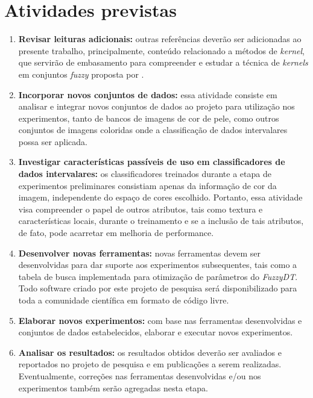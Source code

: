\section{Atividades previstas}
\label{sec:atividades_previstas}
\begin{enumerate}
    \item \textbf{Revisar leituras adicionais:} outras referências deverão ser adicionadas ao presente trabalho, principalmente, conteúdo relacionado a métodos de \emph{kernel}, que servirão de embasamento para compreender e estudar a técnica de \emph{kernels} em conjuntos \emph{fuzzy} proposta por \citet{guevara:14}.

    \item \textbf{Incorporar novos conjuntos de dados:} essa atividade consiste em analisar e integrar novos conjuntos de dados ao projeto para utilização nos experimentos, tanto de bancos de imagens de cor de pele, como outros conjuntos de imagens coloridas onde a classificação de dados intervalares possa ser aplicada.

    \item \textbf{Investigar características passíveis de uso em classificadores de dados intervalares:} os classificadores treinados durante a etapa de experimentos preliminares consistiam apenas da informação de cor da imagem, independente do espaço de cores escolhido. Portanto, essa atividade visa compreender o papel de outros atributos, tais como textura e características locais, durante o treinamento e se a inclusão de tais atributos, de fato, pode acarretar em melhoria de performance.

    \item \textbf{Desenvolver novas ferramentas:} novas ferramentas devem ser desenvolvidas para dar suporte aos experimentos subsequentes, tais como a tabela de busca implementada para otimização de parâmetros do \emph{FuzzyDT}. Todo software criado por este projeto de pesquisa será disponibilizado para toda a comunidade científica em formato de código livre.

    \item \textbf{Elaborar novos experimentos:} com base nas ferramentas desenvolvidas e conjuntos de dados estabelecidos, elaborar e executar novos experimentos.

    \item \textbf{Analisar os resultados:} os resultados obtidos deverão ser avaliados e reportados no projeto de pesquisa e em publicações a serem realizadas. Eventualmente, correções nas ferramentas desenvolvidas e/ou nos experimentos também serão agregadas nesta etapa.


\end{enumerate}
